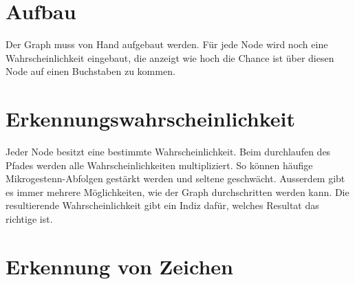 
\section{Aufbau}
Der Graph muss von Hand aufgebaut werden. Für jede Node wird noch eine Wahrscheinlichkeit eingebaut, die anzeigt wie hoch die Chance ist über diesen Node auf einen Buchstaben zu kommen.

\section{Erkennungswahrscheinlichkeit}
Jeder Node besitzt eine bestimmte Wahrscheinlichkeit. Beim durchlaufen des Pfades werden alle Wahrscheinlichkeiten multipliziert. So können häufige Mikrogestenn-Abfolgen gestärkt werden und seltene geschwächt. Ausserdem gibt es immer mehrere Möglichkeiten, wie der Graph durchschritten werden kann. Die resultierende Wahrscheinlichkeit gibt ein Indiz dafür, welches Resultat das richtige ist.

\section{Erkennung von Zeichen}